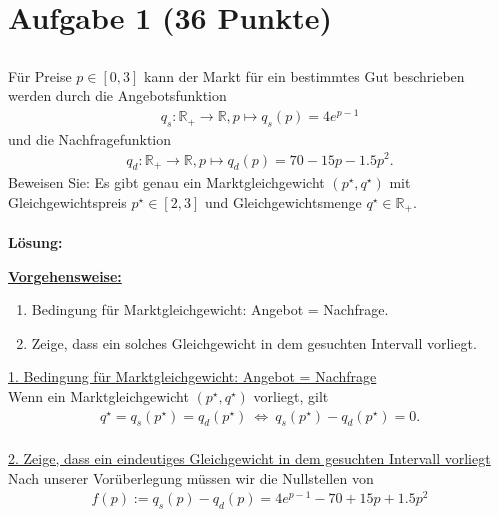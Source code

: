 \vspace{1cm}
\renewcommand{\labelenumi}{\theenumi.}
\section*{Aufgabe 1 (36 Punkte)}
\vspace{0.4cm}
\subsection*{}
Für Preise $ p \in [0,3] $ kann der Markt für ein bestimmtes Gut beschrieben werden durch die Angebotsfunktion
\begin{align*}
q_s : \mathbb{R}_+ \to \mathbb{R}, p \mapsto q_s(p)=  4 e^{p-1}
\end{align*}
und die Nachfragefunktion 
\begin{align*}
q_d: \mathbb{R}_+ \to \mathbb{R}, p \mapsto q_d(p) = 70 -15p -1.5p^2.
\end{align*}
Beweisen Sie: Es gibt genau ein Marktgleichgewicht $ (p^\star,q^\star) $ mit Gleichgewichtspreis $ p^\star \in [2,3]$ und Gleichgewichtsmenge $ q^\star \in \mathbb{R}_+ $.\\
\\
\textbf{Lösung:}
\begin{mdframed}
\underline{\textbf{Vorgehensweise:}}
\renewcommand{\labelenumi}{\theenumi.}
\begin{enumerate}
\item Bedingung für Marktgleichgewicht: Angebot = Nachfrage.
\item Zeige, dass ein solches Gleichgewicht in dem gesuchten Intervall vorliegt.
\end{enumerate}
\end{mdframed}
\underline{1. Bedingung für Marktgleichgewicht: Angebot = Nachfrage}\\
Wenn ein Marktgleichgewicht $ (p^\star, q^\star) $ vorliegt, gilt
\begin{align*}
q^\star = q_s(p^\star) = q_d(p^\star)
\ \Leftrightarrow \
q_s(p^\star) - q_d(p^\star) = 0.
\end{align*}
\ \\
\underline{2. Zeige, dass ein eindeutiges Gleichgewicht in dem gesuchten Intervall vorliegt}\\
Nach unserer Vorüberlegung müssen wir die Nullstellen von
\begin{align*}
f(p) := q_s(p) - q_d(p) 
=4 e^{p-1} - 70+15p+1.5p^2
\end{align*}

